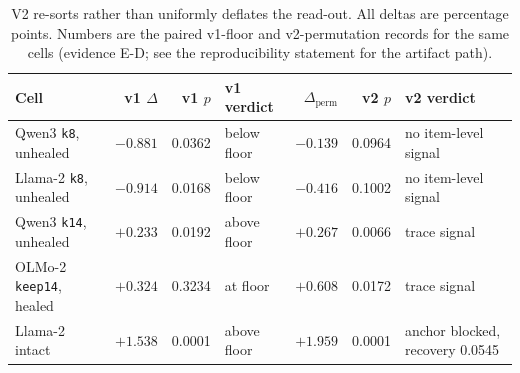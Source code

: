 \begin{table}[!htbp]
\centering
\scriptsize
\setlength{\tabcolsep}{2.8pt}
\begin{tabular}{lrrlrrl}
\toprule
Cell & v1 $\Delta$ & v1 $p$ & v1 verdict & $\Delta_{\mathrm{perm}}$ & v2 $p$ & v2 verdict \\
\midrule
Qwen3 \texttt{k8}, unhealed & $-0.881$ & 0.0362 & below floor & $-0.139$ & 0.0964 & no item-level signal \\
Llama-2 \texttt{k8}, unhealed & $-0.914$ & 0.0168 & below floor & $-0.416$ & 0.1002 & no item-level signal \\
Qwen3 \texttt{k14}, unhealed & $+0.233$ & 0.0192 & above floor & $+0.267$ & 0.0066 & trace signal \\
OLMo-2 \texttt{keep14}, healed & $+0.324$ & 0.3234 & at floor & $+0.608$ & 0.0172 & trace signal \\
Llama-2 intact & $+1.538$ & 0.0001 & above floor & $+1.959$ & 0.0001 & anchor blocked, recovery 0.0545 \\
\bottomrule
\end{tabular}
\caption{V2 re-sorts rather than uniformly deflates the read-out. All deltas are percentage points. Numbers are the paired v1-floor and v2-permutation records for the same cells (evidence \textsf{E-D}; see the reproducibility statement for the artifact path).}
\label{tab:v2-resort}
\end{table}
